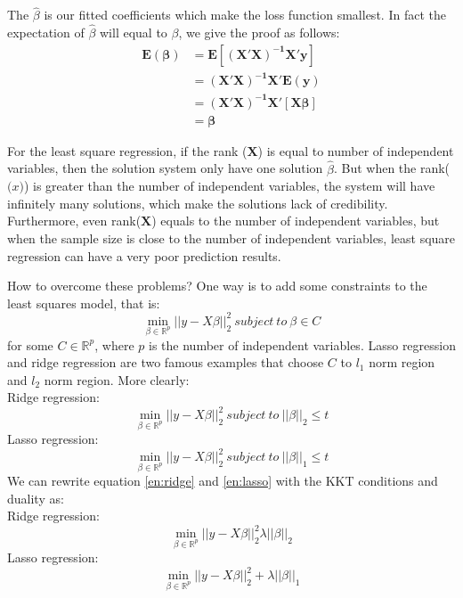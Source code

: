 The $\hat{\beta}$ is our fitted coefficients which make the loss function smallest. In fact the expectation of $\hat{\beta}$ will equal to $\beta$, we give the proof as follows:
\begin{equation}
\begin{aligned}
\bm{E(\beta)}&=\bm{E[(X'X)^{-1}X'y]}\\
&=\bm{(X'X)^{-1}X'E(y)}\\
&=\bm{(X'X)^{-1}X'[X\beta]}\\
&=\bm{\beta}
\end{aligned}
\end{equation}
	
For the least square regression, if the rank ($\bm{X}$) is equal to number of independent variables, then the solution system only have one solution $\hat{\beta}$. But when the rank($\bm(x)$) is greater than the number of independent variables, the system will have infinitely many solutions, which make the solutions lack of credibility. Furthermore, even rank($\bm{X}$) equals to the number of independent variables, but when the sample size is close to the number of independent variables, least square regression can have a very poor prediction results. 

How to overcome these problems? One way is to add some constraints to the least squares model, that is:
\begin{equation}
\min_{\beta\in \mathbb{R}^p}||y-X\beta||_{2}^{2}\ subject\ to\ \beta\in C
\end{equation}
for some $C\in \mathbb{R}^p$, where $p$ is the number of independent variables. Lasso regression and ridge regression are two famous examples that choose $C$ to $l_1$ norm region and $l_2$ norm region. More clearly:\\
Ridge regression:
\begin{equation}\label{en:ridge}
\min_{\beta\in \mathbb{R}^p}||y-X\beta||_{2}^{2}\ subject\ to\ ||\beta||_2\leq t 
\end{equation}
Lasso regression:
\begin{equation}\label{en:lasso}
\min_{\beta\in \mathbb{R}^p}||y-X\beta||_{2}^{2}\ subject\ to\ ||\beta||_1\leq t 
\end{equation}
We can rewrite equation \ref{en:ridge} and \ref{en:lasso} with the KKT conditions and duality as:\\
Ridge regression:
\begin{equation}\label{en:ridge_dual}
\min_{\beta\in \mathbb{R}^p}||y-X\beta||_{2}^{2}\lambda||\beta||_2 
\end{equation}
Lasso regression:
\begin{equation}\label{en:lasso_dual}
\min_{\beta\in \mathbb{R}^p}||y-X\beta||_{2}^{2}+\lambda||\beta||_1 
\end{equation}

